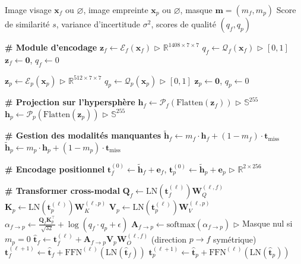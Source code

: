 \documentclass[12pt,a4paper]{report}
\begin{document}
\begin{algorithm}[htbp]
\caption{Forward pass de l'UFM-Transformer}
\label{alg:forward}
\begin{algorithmic}[1]
\REQUIRE Image visage $\mathbf{x}_f$ ou $\varnothing$, image empreinte $\mathbf{x}_p$ ou $\varnothing$, masque $\mathbf{m} = (m_f, m_p)$
\ENSURE Score de similarit\'{e} $s$, variance d'incertitude $\sigma^2$, scores de qualit\'{e} $(q_f, q_p)$

\STATE \textbf{\# Module d'encodage}
    \STATE $\mathbf{z}_f \leftarrow \mathcal{E}_f(\mathbf{x}_f)$ \hfill $\triangleright$ $\mathbb{R}^{1408 \times 7 \times 7}$
    \STATE $q_f \leftarrow \mathcal{Q}_f(\mathbf{x}_f)$ \hfill $\triangleright$ $[0, 1]$
\ELSE
    \STATE $\mathbf{z}_f \leftarrow \mathbf{0}$, $q_f \leftarrow 0$
\ENDIF

    \STATE $\mathbf{z}_p \leftarrow \mathcal{E}_p(\mathbf{x}_p)$ \hfill $\triangleright$ $\mathbb{R}^{512 \times 7 \times 7}$
    \STATE $q_p \leftarrow \mathcal{Q}_p(\mathbf{x}_p)$ \hfill $\triangleright$ $[0, 1]$
\ELSE
    \STATE $\mathbf{z}_p \leftarrow \mathbf{0}$, $q_p \leftarrow 0$
\ENDIF

\STATE \textbf{\# Projection sur l'hypersph\`{e}re}
\STATE $\mathbf{h}_f \leftarrow \mathcal{P}_f(\text{Flatten}(\mathbf{z}_f))$ \hfill $\triangleright$ $\mathbb{S}^{255}$
\STATE $\mathbf{h}_p \leftarrow \mathcal{P}_p(\text{Flatten}(\mathbf{z}_p))$ \hfill $\triangleright$ $\mathbb{S}^{255}$

\STATE \textbf{\# Gestion des modalit\'{e}s manquantes}
\STATE $\tilde{\mathbf{h}}_f \leftarrow m_f \cdot \mathbf{h}_f + (1 - m_f) \cdot \mathbf{t}_{\text{miss}}$
\STATE $\tilde{\mathbf{h}}_p \leftarrow m_p \cdot \mathbf{h}_p + (1 - m_p) \cdot \mathbf{t}_{\text{miss}}$

\STATE \textbf{\# Encodage positionnel}
\STATE $\mathbf{t}_f^{(0)} \leftarrow \tilde{\mathbf{h}}_f + \mathbf{e}_f$, $\mathbf{t}_p^{(0)} \leftarrow \tilde{\mathbf{h}}_p + \mathbf{e}_p$ \hfill $\triangleright$ $\mathbb{R}^{2 \times 256}$

\STATE \textbf{\# Transformer cross-modal}
    \STATE $\mathbf{Q}_f \leftarrow \text{LN}(\mathbf{t}_f^{(\ell)}) \mathbf{W}_Q^{(\ell,f)}$
    \STATE $\mathbf{K}_p \leftarrow \text{LN}(\mathbf{t}_p^{(\ell)}) \mathbf{W}_K^{(\ell,p)}$
    \STATE $\mathbf{V}_p \leftarrow \text{LN}(\mathbf{t}_p^{(\ell)}) \mathbf{W}_V^{(\ell,p)}$
    \STATE $\alpha_{f \rightarrow p} \leftarrow \frac{\mathbf{Q}_f \mathbf{K}_p^\top}{\sqrt{32}} + \log(q_f \cdot q_p + \epsilon)$
    \STATE $\mathbf{A}_{f \rightarrow p} \leftarrow \text{softmax}(\alpha_{f \rightarrow p})$ \hfill $\triangleright$ Masque nul si $m_p = 0$
    \STATE $\hat{\mathbf{t}}_f \leftarrow \mathbf{t}_f^{(\ell)} + \mathbf{A}_{f \rightarrow p} \mathbf{V}_p \mathbf{W}_O^{(\ell,f)}$
    \STATE (direction $p \rightarrow f$ sym\'{e}trique)
    \STATE $\mathbf{t}_f^{(\ell+1)} \leftarrow \hat{\mathbf{t}}_f + \text{FFN}^{(\ell)}(\text{LN}(\hat{\mathbf{t}}_f))$
    \STATE $\mathbf{t}_p^{(\ell+1)} \leftarrow \hat{\mathbf{t}}_p + \text{FFN}^{(\ell)}(\text{LN}(\hat{\mathbf{t}}_p))$
\ENDFOR


\end{algorithmic}
\end{algorithm}
\end{document}
